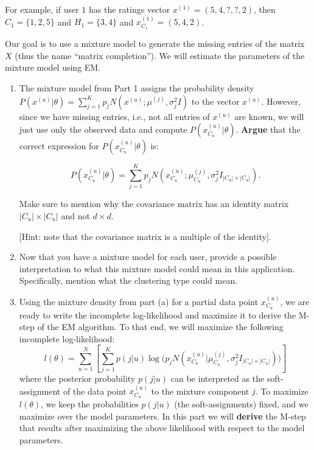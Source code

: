 \begin{enumerate}
For example, if user $1$ has the ratings vector $x^{(1)} =  (5, 4, ?, ?, 2)$, then $C_{1} = \{1, 2, 5\}$ and $H_{1} = \{ 3, 4\}$ and $x^{(1)}_{C_1} = (5, 4, 2)$.

Our goal is to use a mixture model to generate the missing entries of the matrix $X$ (thus the name ``matrix completion''). We will estimate the parameters of the mixture model using EM.

\begin{enumerate}
\item The mixture model from Part 1 assigns the probability density $P(x^{(u)} | \theta) = \sum^{K}_{j=1} p_j N(x^{(u)}; \mu^{(j)}, \sigma^2_j I)$ to the vector $x^{(u)}$. However, since we have missing entries, i.e., not all entries of $x^{(u)}$ are known, we will just use only the observed data and compute $P(x^{(u)}_{C_u} | \theta)$. \textbf{Argue} that the correct expression for $P(x^{(u)}_{C_u}  | \theta)$ is:

 $$P(x^{(u)}_{C_u}  | \theta) = \sum^{K}_{j=1} p_j N(x^{(u)}_{C_u} ; \mu^{(j)}_{C_u} , \sigma^2_j I_{|C_u| \times |C_u|}).$$

Make sure to mention why the covariance matrix has an identity matrix $ |C_u| \times |C_u| $ and not $ d \times d $.

 [Hint: note that the covariance matrix is a multiple of the identity].


 \item Now that you have a mixture model for each user, provide a possible interpretation to what this mixture model could mean in this application. Specifically, mention what the clustering type could mean.

\item Using the mixture density from part (a) for a partial data point $x^{(u)}_{C_u}$, we are ready to write the incomplete log-likelihood and maximize it to derive the M-step of the EM algorithm.
To that end, we will maximize the following incomplete log-likelihood:
$$ l(\theta) = \sum_{u=1}^N \left[ \sum^{K}_{j=1} p(j|u) \log\bigl( p_j N(x^{(u)}_{C_u} | \mu^{(j)}_{C_u}, \sigma^2_j I_{|C_u| \times |C_u|} ) \bigr) \right]$$
where the posterior probability $p(j|u)$ can be interpreted as the soft-assignment of the data point $x^{(u)}_{C_u}$ to the mixture component $j$. To maximize $l( \theta)$, we keep the probabilities $p(j|u)$ (the soft-assignments) fixed, and we maximize over the model parameters. In this part we will \textbf{derive} the M-step that results after maximizing the above likelihood with respect to the model parameters.


\end{enumerate}
\end{enumerate}
